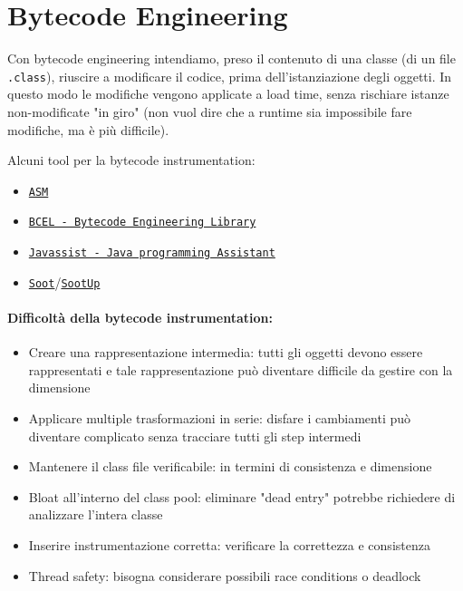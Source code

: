 \section{Bytecode Engineering}

Con bytecode engineering intendiamo, preso il contenuto di una classe (di un file \texttt{.class}), riuscire a modificare il codice, prima dell'istanziazione degli oggetti. In questo modo le modifiche vengono applicate a load time, senza rischiare istanze non-modificate "in giro" (non vuol dire che a runtime sia impossibile fare modifiche, ma è più difficile).

Alcuni tool per la bytecode instrumentation:
\begin{itemize}
    \item \href{https://asm.ow2.io/}{\texttt{ASM}}

    \item \href{https://commons.apache.org/proper/commons-bcel/}{\texttt{BCEL - Bytecode Engineering Library}}

    \item \href{https://www.javassist.org/}{\texttt{Javassist - Java programming Assistant}}

    \item \href{https://github.com/soot-oss/soot}{\texttt{Soot}}/\href{https://github.com/soot-oss/SootUp}{\texttt{SootUp}}
\end{itemize}

\paragraph{Difficoltà della bytecode instrumentation:}
\begin{itemize}
    \item Creare una rappresentazione intermedia: tutti gli oggetti devono essere rappresentati e tale rappresentazione può diventare difficile da gestire con la dimensione

    \item Applicare multiple trasformazioni in serie: disfare i cambiamenti può diventare complicato senza tracciare tutti gli step intermedi

    \item Mantenere il class file verificabile: in termini di consistenza e dimensione

    \item Bloat all'interno del class pool: eliminare "dead entry" potrebbe richiedere di analizzare l'intera classe

    \item Inserire instrumentazione corretta: verificare la correttezza e consistenza

    \item Thread safety: bisogna considerare possibili race conditions o deadlock
\end{itemize}

